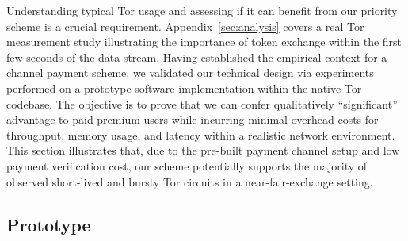 Understanding typical Tor usage and assessing if it can benefit from our priority scheme is a crucial requirement.
Appendix~\ref{sec:analysis} covers a real Tor measurement study illustrating the importance of token exchange within the first few seconds of the data stream.
Having established the empirical context for a channel payment scheme, we validated our technical design via experiments performed on a prototype software implementation within the native Tor codebase.
The objective is to prove that we can confer qualitatively ``significant'' advantage to paid premium users while incurring minimal overhead costs for throughput, memory usage, and latency within a realistic network environment.
This section illustrates that, due to the pre-built payment channel setup and low payment verification cost, our scheme potentially supports the majority of observed short-lived and bursty Tor circuits in a near-fair-exchange setting.

\subsection{Prototype}

